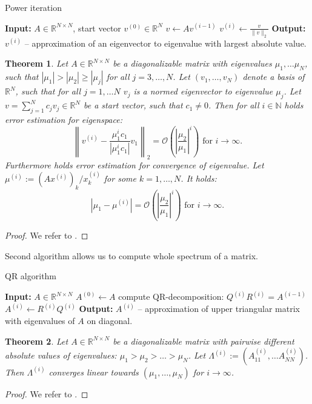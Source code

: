 \documentclass[a4paper,11pt,bibliography=totoc,listof=totoc,headinclude=true,cleardoublepage=empty,oneside]{scrbook}
\newtheorem{theorem}{Theorem}[chapter]
\newcommand{\R}{\mathbb{R}}
\newcommand{\N}{\mathbb{N}}
\newcommand{\bigO}{\mathcal{O}}
\begin{document}
\begin{algorithm}[H]
\caption{Power iteration}\label{alg:power iteration}
\begin{algorithmic}
    \State \textbf{Input:} $A \in \R^{N \times N}$, start vector $v^{(0)}\in \R^N$
        \State $v \gets Av^{(i-1)} $
        \State $v^{(i)} \gets \frac{v}{\|v\|_2}$
    \EndFor
    \State \textbf{Output:} $v^{(i)}$ -- approximation of an eigenvector to eigenvalue with largest absolute value.
    \end{algorithmic}
\end{algorithm}
\begin{theorem}
    Let $A \in \R^{N \times N}$ be a diagonalizable matrix with eigenvalues $\mu_1, \dots \mu_N$, such that $|\mu_1| > |\mu_2| \geq |\mu_j|$ for all $j  = 3,\dots,N$. Let $(v_1, \dots, v_N)$ denote a basis of $\R^N$, such that for all $j=1, \dots N$ $v_j$ is a normed eigenvector to eigenvalue $\mu_j$. Let $v = \sum_{j=1}^N c_j v_j \in \R^N$ be a start vector, such that $c_1 \neq 0$. Then for all $i \in \N$ holds error estimation for eigenspace:
    \begin{equation*}
        \left\| v^{(i)} - \frac{\mu_1^i c_1}{|\mu_1^i c_1|} v_1 \right\|_2 = \bigO\left( \left|\frac{\mu_2}{\mu_1}\right|^i\right) \text{ for } i \rightarrow \infty.
    \end{equation*}
    Furthermore holds error estimation for convergence of eigenvalue. Let $\mu^{(i)} := (Ax^{(i)})_k / x^{(i)}_k $ for some $k = 1, \dots, N$. It holds:
    \begin{equation*}
        |\mu_1 - \mu^{(i)}| = \bigO\left( \left|\frac{\mu_2}{\mu_1}\right|^i\right) \text{ for } i \rightarrow \infty.
    \end{equation*}
\end{theorem}
\begin{proof}
    We refer to \cite[p. 116]{numericsAB}.
\end{proof}

Second algorithm allows us to compute whole spectrum of a matrix. 
\begin{algorithm}[H]
\caption{QR algorithm}\label{alg:QR alg}
\begin{algorithmic}
    \State \textbf{Input:} $A \in \R^{N \times N}$
    \State $A^{(0)} \gets A$
        \State compute QR-decomposition: $Q^{(i)} R^{(i)} = A^{(i-1)}$ 
        \State $A^{(i)} \gets R^{(i)}Q^{(i)}$
    \EndFor
    \State \textbf{Output:} $A^{(i)}$ -- approximation of upper triangular matrix with eigenvalues of $A$ on diagonal. 
    \end{algorithmic}
\end{algorithm}
\begin{theorem}
    Let $A \in \R^{N \times N}$ be a diagonalizable matrix with pairwise different absolute values of eigenvalues: $\mu_1 > \mu_2 > \dots > \mu_N$. Let $\Lambda^{(i)} := \left(A^{(i)}_{11}, \dots A^{(i)}_{NN}\right)$. Then $\Lambda^{(i)}$ converges linear towards $(\mu_1, \dots, \mu_N)$ for $i\rightarrow\infty$. 
\end{theorem}
\begin{proof}
    We refer to \cite[p. 120]{numericsAB}.
\end{proof}
\end{document}
